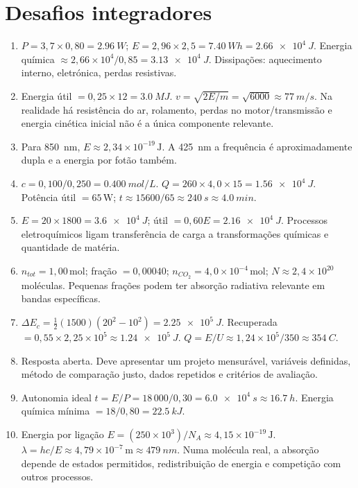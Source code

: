 \documentclass[11pt,a4paper,oneside]{book}
\begin{document}
\section*{Desafios integradores}
\begin{enumerate}
  \item $P=3{,}7\times0{,}80=\SI{2.96}{W}$; $E=2{,}96\times2{,}5=\SI{7.40}{Wh}=\SI{2.66e4}{J}$. Energia química $\approx2{,}66\times10^4/0{,}85=\SI{3.13e4}{J}$. Dissipações: aquecimento interno, eletrónica, perdas resistivas.
  \item Energia útil $=0{,}25\times12=\SI{3.0}{MJ}$. $v=\sqrt{2E/m}=\sqrt{6000}\approx\SI{77}{m/s}$. Na realidade há resistência do ar, rolamento, perdas no motor/transmissão e energia cinética inicial não é a única componente relevante.
  \item Para \SI{850}{nm}, $E\approx2{,}34\times10^{-19}\,\mathrm{J}$. A \SI{425}{nm} a frequência é aproximadamente dupla e a energia por fotão também.
  \item $c=0{,}100/0{,}250=\SI{0.400}{mol/L}$. $Q=260\times4{,}0\times15=\SI{1.56e4}{J}$. Potência útil $=65\,\mathrm{W}$; $t\approx15600/65\approx\SI{240}{s}\approx\SI{4.0}{min}$.
  \item $E=20\times1800=\SI{3.6e4}{J}$; útil $=0{,}60E=\SI{2.16e4}{J}$. Processos eletroquímicos ligam transferência de carga a transformações químicas e quantidade de matéria.
  \item $n_{tot}=1{,}00\,\mathrm{mol}$; fração $=0{,}00040$; $n_{CO_2}=4{,}0\times10^{-4}\,\mathrm{mol}$; $N\approx2{,}4\times10^{20}$ moléculas. Pequenas frações podem ter absorção radiativa relevante em bandas específicas.
  \item $\Delta E_c=\frac12(1500)(20^2-10^2)=\SI{2.25e5}{J}$. Recuperada $=0{,}55\times2{,}25\times10^5\approx\SI{1.24e5}{J}$. $Q=E/U\approx1{,}24\times10^5/350\approx\SI{354}{C}$.
  \item Resposta aberta. Deve apresentar um projeto mensurável, variáveis definidas, método de comparação justo, dados repetidos e critérios de avaliação.
  \item Autonomia ideal $t=E/P=18\,000/0{,}30=\SI{6.0e4}{s}\approx\SI{16.7}{h}$. Energia química mínima $=18/0{,}80=\SI{22.5}{kJ}$.
  \item Energia por ligação $E=(250\times10^3)/N_A\approx4{,}15\times10^{-19}\,\mathrm{J}$. $\lambda=hc/E\approx4{,}79\times10^{-7}\,\mathrm{m}\approx\SI{479}{nm}$. Numa molécula real, a absorção depende de estados permitidos, redistribuição de energia e competição com outros processos.
\end{enumerate}
\end{document}
